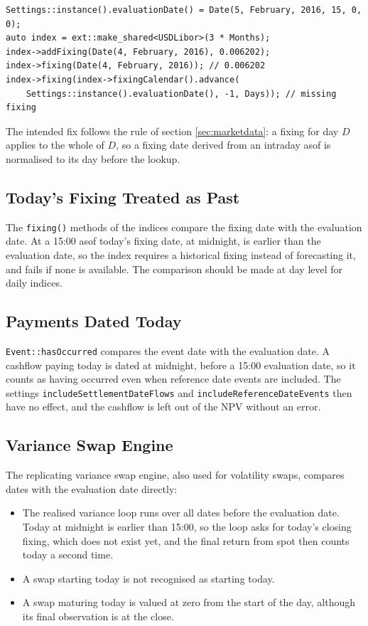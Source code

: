 \documentclass[12pt, a4paper]{article}
\begin{document}
\begin{verbatim}
Settings::instance().evaluationDate() = Date(5, February, 2016, 15, 0, 0);
auto index = ext::make_shared<USDLibor>(3 * Months);
index->addFixing(Date(4, February, 2016), 0.006202);
index->fixing(Date(4, February, 2016)); // 0.006202
index->fixing(index->fixingCalendar().advance(
    Settings::instance().evaluationDate(), -1, Days)); // missing fixing
\end{verbatim}

The intended fix follows the rule of section \ref{sec:marketdata}: a fixing for day $D$ applies to the whole of $D$, so
a fixing date derived from an intraday asof is normalised to its day before the lookup.

\subsection{Today's Fixing Treated as Past}\label{sec:lim-todayfixing}

The \texttt{fixing()} methods of the indices compare the fixing date with the evaluation date. At a 15:00 asof today's
fixing date, at midnight, is earlier than the evaluation date, so the index requires a historical fixing instead of
forecasting it, and fails if none is available. The comparison should be made at day level for daily indices.

\subsection{Payments Dated Today}

\texttt{Event::hasOccurred} compares the event date with the evaluation date. A cashflow paying today is dated at
midnight, before a 15:00 evaluation date, so it counts as having occurred even when reference date events are
included. The settings \texttt{includeSettlementDateFlows} and \texttt{includeReferenceDateEvents} then have no effect,
and the cashflow is left out of the NPV without an error.

\subsection{Variance Swap Engine}\label{sec:lim-varswap}

The replicating variance swap engine, also used for volatility swaps, compares dates with the evaluation date
directly:

\begin{itemize}
\item The realised variance loop runs over all dates before the evaluation date. Today at midnight is earlier than
  15:00, so the loop asks for today's closing fixing, which does not exist yet, and the final return from spot then
  counts today a second time.
\item A swap starting today is not recognised as starting today.
\item A swap maturing today is valued at zero from the start of the day, although its final observation is at the
  close.
\end{itemize}
\end{document}
